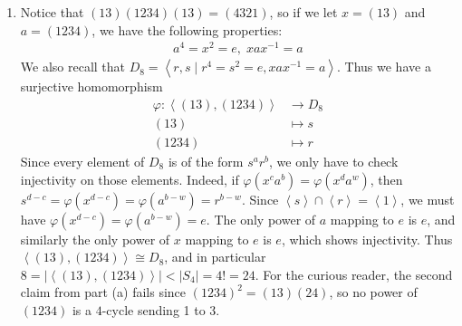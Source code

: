 \documentclass[12pt]{article}
\theoremstyle{definitionstyle}
\def \cph{\varphi}
\newcommand{\gen}[1]{\left\langle #1 \right\rangle}
\begin{document}
\begin{enumerate}[leftmargin=\labelsep]
\begin{enumerate}
			\item Notice that $(13)(1234)(13) = (4321)$, so if we let $x = (13)$ and $a = (1234)$, we have the following properties:
			\begin{align*}
				a^4 = x^2 = e, \; xax^{-1} = a
			\end{align*}
			We also recall that $D_8 = \gen{r, s \mid r^4 = s^2 = e, xax^{-1} = a}$. Thus we have a surjective homomorphism
			\begin{align*}
				\cph: \gen{(13), (1234)} &\to D_8 \\
				(13) &\mapsto s \\
				(1234) &\mapsto r
			\end{align*}
			Since every element of $D_8$ is of the form $s^ar^b$, we only have to check injectivity on those elements. Indeed, if $\cph(x^ca^b) = \cph(x^da^w)$, then $s^{d-c} = \cph(x^{d-c}) = \cph(a^{b-w}) = r^{b-w}$. Since $\gen{s} \cap \gen{r} = \gen{1}$, we must have $\cph(x^{d-c}) = \cph(a^{b-w}) = e$. The only power of $a$ mapping to $e$ is $e$, and similarly the only power of $x$ mapping to $e$ is $e$, which shows injectivity. Thus $\gen{(13), (1234)} \cong D_8$, and in particular $8 = |\gen{(13), (1234)}| < |S_4| = 4! = 24$. For the curious reader, the second claim from part (a) fails since $(1234)^2 = (13)(24)$, so no power of $(1234)$ is a $4$-cycle sending 1 to 3.
			

\end{enumerate}
\end{enumerate}
\end{document}
